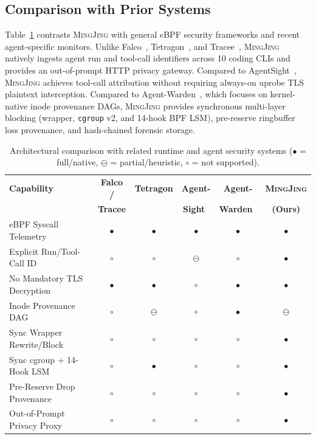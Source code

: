 \documentclass[10pt,twocolumn,letterpaper]{article}
\newcommand{\sys}{\textsc{MingJing}}
\newcommand{\code}[1]{\texttt{\small #1}}
\begin{document}
\subsection{Comparison with Prior Systems}
Table~\ref{tab:comparison} contrasts \sys{} with general eBPF security frameworks and recent agent-specific monitors. Unlike Falco~\cite{falco}, Tetragon~\cite{tetragon}, and Tracee~\cite{tracee}, \sys{} natively ingests agent run and tool-call identifiers across 10 coding CLIs and provides an out-of-prompt HTTP privacy gateway. Compared to AgentSight~\cite{agentsight2025}, \sys{} achieves tool-call attribution without requiring always-on uprobe TLS plaintext interception. Compared to Agent-Warden~\cite{agentwarden2026}, which focuses on kernel-native inode provenance DAGs, \sys{} provides synchronous multi-layer blocking (wrapper, \code{cgroup} v2, and 14-hook BPF LSM), pre-reserve ringbuffer loss provenance, and hash-chained forensic storage.

\begin{table}[t]
\centering
\scriptsize
\setlength{\tabcolsep}{2.2pt}
\caption{Architectural comparison with related runtime and agent security systems ($\bullet$ = full/native, $\ominus$ = partial/heuristic, $\circ$ = not supported).}
\label{tab:comparison}
\begin{tabular}{@{}lccccc@{}}
\toprule
\textbf{Capability} & \textbf{Falco /} & \textbf{Tetragon} & \textbf{Agent-} & \textbf{Agent-} & \textbf{\sys{}} \\
 & \textbf{Tracee} & \cite{tetragon} & \textbf{Sight}~\cite{agentsight2025} & \textbf{Warden}~\cite{agentwarden2026} & \textbf{(Ours)} \\
\midrule
eBPF Syscall Telemetry        & $\bullet$ & $\bullet$ & $\bullet$ & $\bullet$ & $\bullet$ \\
Explicit Run/Tool-Call ID     & $\circ$   & $\circ$   & $\ominus$ & $\circ$   & $\bullet$ \\
No Mandatory TLS Decryption   & $\bullet$ & $\bullet$ & $\circ$   & $\bullet$ & $\bullet$ \\
Inode Provenance DAG          & $\circ$   & $\ominus$ & $\circ$   & $\bullet$ & $\ominus$ \\
Sync Wrapper Rewrite/Block    & $\circ$   & $\circ$   & $\circ$   & $\circ$   & $\bullet$ \\
Sync cgroup + 14-Hook LSM     & $\circ$   & $\bullet$ & $\circ$   & $\circ$   & $\bullet$ \\
Pre-Reserve Drop Provenance   & $\circ$   & $\circ$   & $\circ$   & $\circ$   & $\bullet$ \\
Out-of-Prompt Privacy Proxy   & $\circ$   & $\circ$   & $\circ$   & $\circ$   & $\bullet$ \\
\bottomrule
\end{tabular}
\end{table}
\end{document}

